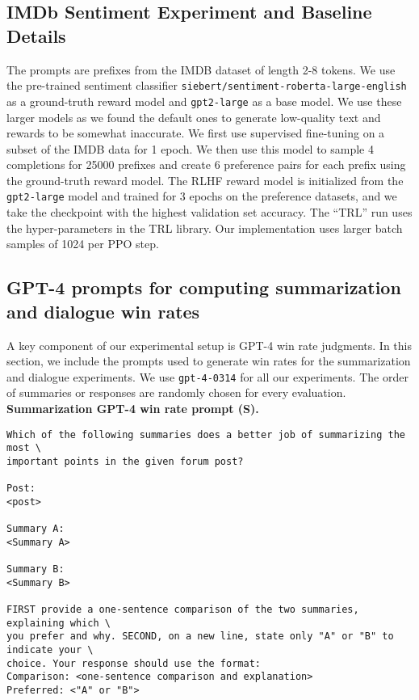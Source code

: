 \documentclass{article}
\begin{document}
\subsection{IMDb Sentiment Experiment and Baseline Details}
\label{app:sentiment_details}
The prompts are prefixes from the IMDB dataset of length 2-8 tokens. We use the pre-trained sentiment classifier \texttt{siebert/sentiment-roberta-large-english} as a ground-truth reward model and \texttt{gpt2-large} as a base model. We use these larger models as we found the default ones to generate low-quality text and rewards to be somewhat inaccurate. We first use supervised fine-tuning on a subset of the IMDB data for 1 epoch. We then use this model to sample 4 completions for 25000 prefixes and create 6 preference pairs for each prefix using the ground-truth reward model. The RLHF reward model is initialized from the \texttt{gpt2-large} model and trained for 3 epochs on the preference datasets, and we take the checkpoint with the highest validation set accuracy. The ``TRL” run uses the hyper-parameters in the TRL library. Our implementation uses larger batch samples of 1024 per PPO step.

\subsection{GPT-4 prompts for computing summarization and dialogue win rates}
\label{app:prompts}
A key component of our experimental setup is GPT-4 win rate judgments. In this section, we include the prompts used to generate win rates for the summarization and dialogue experiments. We use \texttt{gpt-4-0314} for all our experiments. The order of summaries or responses are randomly chosen for every evaluation.\\[2mm]
\textbf{Summarization GPT-4 win rate prompt (S).}
\begin{verbatim}
Which of the following summaries does a better job of summarizing the most \
important points in the given forum post?

Post:
<post>

Summary A:
<Summary A>

Summary B:
<Summary B>

FIRST provide a one-sentence comparison of the two summaries, explaining which \
you prefer and why. SECOND, on a new line, state only "A" or "B" to indicate your \ 
choice. Your response should use the format:
Comparison: <one-sentence comparison and explanation>
Preferred: <"A" or "B">
\end{verbatim}
\end{document}

